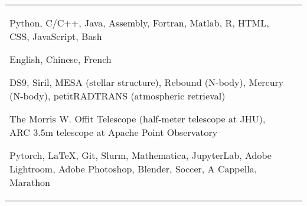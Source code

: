 \documentclass[10pt]{article} %
\begin{document}



\vspace{-0.4cm}


\begin{longtable}{L{4cm}@{\hskip 0.15in}L{13.5cm}} %

	
	
	
	{Python, C/C++, Java, Assembly, Fortran, Matlab, R, HTML, CSS, JavaScript, Bash} %
	
	{English, Chinese, French} %
	
	{DS9, Siril, MESA (stellar structure), Rebound (N-body), Mercury (N-body), petitRADTRANS (atmospheric retrieval)} %
	

	{The Morris W. Offit Telescope (half-meter telescope at JHU), ARC 3.5m telescope at Apache Point Observatory} %

	
	
	{Pytorch, \LaTeX, Git, Slurm, Mathematica, JupyterLab, Adobe Lightroom, Adobe Photoshop, Blender, Soccer, A Cappella, Marathon} 
\end{longtable}
\end{document}
